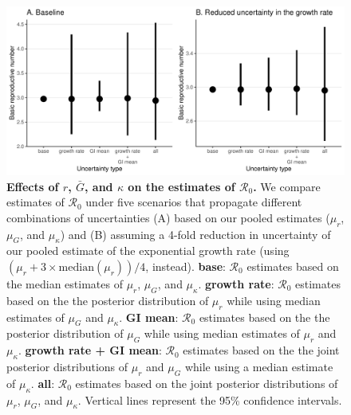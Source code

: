 \documentclass[12pt]{article}
\newcommand{\Ro}{\ensuremath{{\mathcal R}_{0}}\xspace}
\begin{document}
\begin{figure}[!ht]
\includegraphics[width=\textwidth]{figure2.pdf}
\caption{
  \textbf{Effects of $r$, $\bar G$, and $\kappa$ on the estimates of \Ro.}
We compare estimates of \Ro under five scenarios that propagate different combinations of uncertainties (A) based on our pooled estimates ($\mu_r$, $\mu_G$, and $\mu_\kappa$) and (B) assuming a 4-fold reduction in uncertainty of our pooled estimate of the exponential growth rate (using $(\mu_r + 3\times\mathrm{median}(\mu_r))/4$, instead).
\textbf{base}: \Ro estimates based on the median estimates of $\mu_r$, $\mu_G$, and $\mu_\kappa$.
\textbf{growth rate}: \Ro estimates based on the the posterior distribution of $\mu_r$ while using median estimates of $\mu_G$ and $\mu_\kappa$.
\textbf{GI mean}: \Ro estimates based on the the posterior distribution of $\mu_G$ while using median estimates of $\mu_r$ and $\mu_\kappa$.
\textbf{growth rate + GI mean}: \Ro estimates based on the the joint posterior distributions of $\mu_r$ and $\mu_G$ while using a median estimate of $\mu_\kappa$.
\textbf{all}: \Ro estimates based on the joint posterior distributions of  $\mu_r$, $\mu_G$, and $\mu_\kappa$.
Vertical lines represent the 95\% confidence intervals.
}
\label{fig:eff}
\end{figure}
\end{document}
